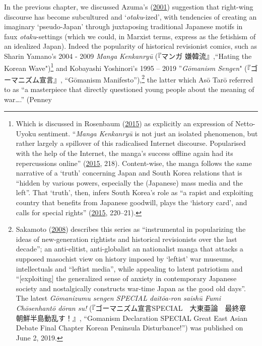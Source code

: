 \documentclass[10pt,british,A4paper,oneside]{memoir}
\begin{document}
In the previous chapter, we discussed Azuma's
(\protect\hyperlink{ref-azuma_otaku:_2001}{2001}) suggestion that
right-wing discourse has become subcultured and `\emph{otaku}-ized',
with tendencies of creating an imaginary `pseudo-Japan' through
juxtaposing traditional Japanese motifs in faux \emph{otaku}-settings
(which we could, in Marxist terms, express as the fetishism of an
idealized Japan). Indeed the popularity of historical revisionist
comics, such as Sharin Yamano's 2004 - 2009 \emph{Manga Kenkanryū}
(『マンガ 嫌韓流』,``Hating the Korean Wave")\footnote{Which is
  discussed in Rosenbaum
  (\protect\hyperlink{ref-rosenbaum_manga_2015}{2015}) as explicitly an
  expression of Netto-Uyoku sentiment. ``\emph{Manga Kenkanryū} is not
  just an isolated phenomenon, but rather largely a spillover of this
  radicalised Internet discourse. Popularised with the help of the
  Internet, the manga's success offline again had its repercussions
  online'' (\protect\hyperlink{ref-rosenbaum_manga_2015}{2015}, 218).
  Content-wise, the manga follows the same narrative of a `truth'
  concerning Japan and South Korea relations that is ``hidden by various
  powers, especially the (Japanese) mass media and the left''. That
  `truth', then, infers South Korea's role as ``a rapist and exploiting country that
  benefits from Japanese goodwill, plays the `history card', and calls
  for special rights''
  (\protect\hyperlink{ref-rosenbaum_manga_2015}{2015}, 220--21).} and
Kobayashi Yoshinori's 1995 -- 2019 ''\emph{Gōmanism Sengen}"
(『ゴーマニズム宣言』, ``Gōmanism Manifesto''),\footnote{Sakamoto
  (\protect\hyperlink{ref-sakamoto_will_2008}{2008}) describes this
  series as ``instrumental in popularizing the ideas of new-generation
  rightists and historical revisionists over the last decade''; an
  anti-elitist, anti-globalist an nationalist manga that attacks a
  supposed masochist view on history imposed by `leftist' war museums,
  intellectuals and ``leftist media'', while appealing to latent
  patriotism and ``{[}exploiting{]} the generalized sense of anxiety in
  contemporary Japanese society and nostalgically constructs war-time
  Japan as the good old days''. The latest \emph{Gōmanizumu sengen
  SPECIAL daitōa-ron saishū Fumi Chōsenhantō dōran su!}
  (『ゴーマニズム宣言SPECIAL　大東亜論　最終章　朝鮮半島動乱す！』,
  ``Gomanism Declaration SPECIAL Great East Asian Debate Final Chapter
  Korean Peninsula Disturbance!'') was published on June 2, 2019.} the
latter which Asō Tarō referred to as ``a masterpiece that directly
questioned young people about the meaning of war\ldots{}.'' (Penney
\end{document}
